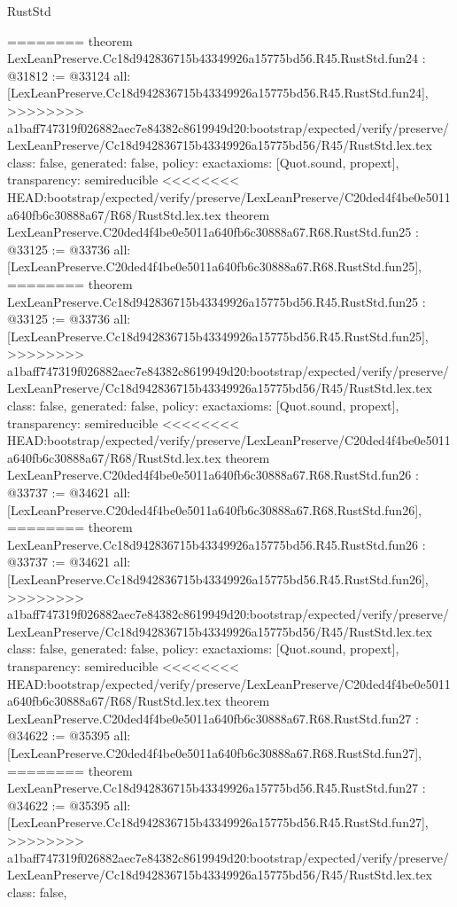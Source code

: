 \begin{lexlean}{RustStd}
\begin{coremodule}
{\begin{coremodule}
{{{{{{{{{{{{{{{{{{{{{{{{{{{========
theorem LexLeanPreserve.Cc18d942836715b43349926a15775bd56.R45.RustStd.fun24 : @31812 := @33124 {
  all: [LexLeanPreserve.Cc18d942836715b43349926a15775bd56.R45.RustStd.fun24],
>>>>>>>> a1baff747319f026882aec7e84382c8619949d20:bootstrap/expected/verify/preserve/LexLeanPreserve/Cc18d942836715b43349926a15775bd56/R45/RustStd.lex.tex
  class: false,
  generated: false,
  policy: exact{axioms: [Quot.sound, propext]},
  transparency: semireducible
}
<<<<<<<< HEAD:bootstrap/expected/verify/preserve/LexLeanPreserve/C20ded4f4be0e5011a640fb6c30888a67/R68/RustStd.lex.tex
theorem LexLeanPreserve.C20ded4f4be0e5011a640fb6c30888a67.R68.RustStd.fun25 : @33125 := @33736 {
  all: [LexLeanPreserve.C20ded4f4be0e5011a640fb6c30888a67.R68.RustStd.fun25],
========
theorem LexLeanPreserve.Cc18d942836715b43349926a15775bd56.R45.RustStd.fun25 : @33125 := @33736 {
  all: [LexLeanPreserve.Cc18d942836715b43349926a15775bd56.R45.RustStd.fun25],
>>>>>>>> a1baff747319f026882aec7e84382c8619949d20:bootstrap/expected/verify/preserve/LexLeanPreserve/Cc18d942836715b43349926a15775bd56/R45/RustStd.lex.tex
  class: false,
  generated: false,
  policy: exact{axioms: [Quot.sound, propext]},
  transparency: semireducible
}
<<<<<<<< HEAD:bootstrap/expected/verify/preserve/LexLeanPreserve/C20ded4f4be0e5011a640fb6c30888a67/R68/RustStd.lex.tex
theorem LexLeanPreserve.C20ded4f4be0e5011a640fb6c30888a67.R68.RustStd.fun26 : @33737 := @34621 {
  all: [LexLeanPreserve.C20ded4f4be0e5011a640fb6c30888a67.R68.RustStd.fun26],
========
theorem LexLeanPreserve.Cc18d942836715b43349926a15775bd56.R45.RustStd.fun26 : @33737 := @34621 {
  all: [LexLeanPreserve.Cc18d942836715b43349926a15775bd56.R45.RustStd.fun26],
>>>>>>>> a1baff747319f026882aec7e84382c8619949d20:bootstrap/expected/verify/preserve/LexLeanPreserve/Cc18d942836715b43349926a15775bd56/R45/RustStd.lex.tex
  class: false,
  generated: false,
  policy: exact{axioms: [Quot.sound, propext]},
  transparency: semireducible
}
<<<<<<<< HEAD:bootstrap/expected/verify/preserve/LexLeanPreserve/C20ded4f4be0e5011a640fb6c30888a67/R68/RustStd.lex.tex
theorem LexLeanPreserve.C20ded4f4be0e5011a640fb6c30888a67.R68.RustStd.fun27 : @34622 := @35395 {
  all: [LexLeanPreserve.C20ded4f4be0e5011a640fb6c30888a67.R68.RustStd.fun27],
========
theorem LexLeanPreserve.Cc18d942836715b43349926a15775bd56.R45.RustStd.fun27 : @34622 := @35395 {
  all: [LexLeanPreserve.Cc18d942836715b43349926a15775bd56.R45.RustStd.fun27],
>>>>>>>> a1baff747319f026882aec7e84382c8619949d20:bootstrap/expected/verify/preserve/LexLeanPreserve/Cc18d942836715b43349926a15775bd56/R45/RustStd.lex.tex
  class: false,
}}}}}}}}}}}}}}}}}}}}}}}}}}}}}}}
\end{coremodule}}
\end{coremodule}
\end{lexlean}
